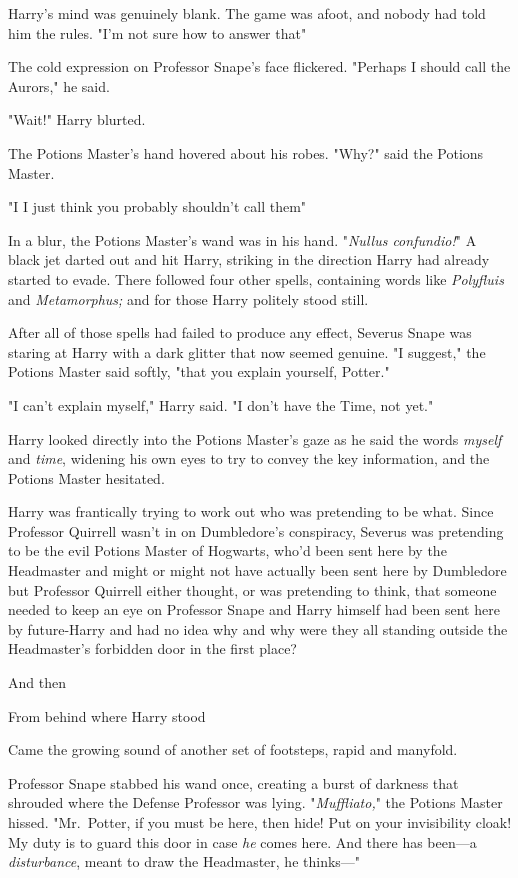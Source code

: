 Harry's mind was genuinely blank. The game was afoot, and nobody had told him
the rules. "I'm not sure how to answer that{\el}"

The cold expression on Professor Snape's face flickered. "Perhaps I should call
the Aurors," he said.

"Wait!" Harry blurted.

The Potions Master's hand hovered about his robes. "Why?" said the Potions
Master.

"I{\el} I just think you probably shouldn't call them{\el}"

In a blur, the Potions Master's wand was in his hand. "\emph{Nullus
confundio!}" A black jet darted out and hit Harry, striking in the direction
Harry had already started to evade. There followed four other spells,
containing words like \emph{Polyfluis} and \emph{Metamorphus;} and for those
Harry politely stood still.

After all of those spells had failed to produce any effect, Severus Snape was
staring at Harry with a dark glitter that now seemed genuine. "I suggest," the
Potions Master said softly, "that you explain yourself, Potter."

"I can't explain myself," Harry said. "I don't have the Time, not yet."

Harry looked directly into the Potions Master's gaze as he said the words
\emph{myself} and \emph{time}, widening his own eyes to try to convey the key
information, and the Potions Master hesitated.

Harry was frantically trying to work out who was pretending to be what. Since
Professor Quirrell wasn't in on Dumbledore's conspiracy, Severus was pretending
to be the evil Potions Master of Hogwarts, who'd been sent here by the
Headmaster{\el} and might or might not have actually been sent here by
Dumbledore{\el} but Professor Quirrell either thought, or was pretending to
think, that someone needed to keep an eye on Professor Snape{\el} and Harry
himself had been sent here by future-Harry and had no idea why{\el} and why
were they all standing outside the Headmaster's forbidden door in the first
place?

And then{\el}

From behind where Harry stood{\el}

Came the growing sound of another set of footsteps, rapid and manyfold.

Professor Snape stabbed his wand once, creating a burst of darkness that
shrouded where the Defense Professor was lying. "\emph{Muffliato,}" the Potions
Master hissed. "Mr.~Potter, if you must be here, then hide! Put on your
invisibility cloak! My duty is to guard this door in case \emph{he} comes here.
And there has been---a \emph{disturbance}, meant to draw the Headmaster, he
thinks\mbox{---}"

